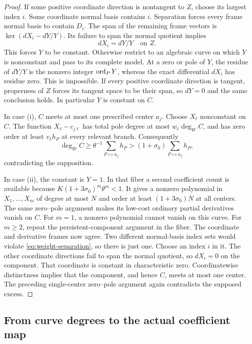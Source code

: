 \begin{proof}
If some positive coordinate direction is nontangent to \(Z\),
choose its largest index \(i\). Some coordinate normal basis contains
\(i\). Separation forces every frame normal basis to contain \(D_i\).
The span of the remaining frame vectors is
\(\ker(dX_i-dY/Y)\). Its failure to span the normal quotient implies
\[
 dX_i=dY/Y\quad\text{on }Z.
\]
This forces \(Y\) to be constant. Otherwise restrict to an algebraic
curve on which \(Y\) is nonconstant and pass to its complete model.
At a zero or pole of \(Y\), the residue of \(dY/Y\) is the
nonzero integer \(\operatorname{ord}_PY\), whereas the exact differential \(dX_i\)
has residue zero. This is impossible.
If every positive coordinate direction is tangent, properness of \(Z\)
forces its tangent space to be their span, so \(dY=0\) and the same
conclusion holds. In particular \(Y\) is constant on \(C\).

In case (i), \(C\) meets at most one prescribed center \(a_j\).
Choose \(X_\ell\) nonconstant on \(C\). The function
\(X_\ell-c_{j\ell}\) has total pole degree at most
\(w_\ell\deg_W C\), and has zero order at least \(v_\ell h_P\)
at every relevant branch. Consequently
\[
 \deg_W C\ge\theta^{-1}\sum_{P\mapsto a_j}h_P
          >(1+\sigma_0)\sum_{P\mapsto a_j}h_P,
\]
contradicting the supposition.

In case (ii), the constant is \(Y=1\).
In that fiber a second coefficient count is available because
\(K(1+3\sigma_0)^m\theta^m<1\).
It gives a nonzero polynomial in \(X_1,\ldots,X_m\) of degree
at most \(N\) and order at least \((1+3\sigma_0)N\) at all centers.
The same zero--pole argument makes its low-cost ordinary partial
derivatives vanish on \(C\).
For \(m=1\), a nonzero polynomial cannot vanish on this curve.
For \(m\ge2\), repeat the persistent-component argument in the fiber.
The coordinate and derivative frames now agree.
Two different normal-basis index sets would violate
\eqref{eq:weight-separation}, so there is just one.
Choose an index \(i\) in it. The other coordinate directions fail
to span the normal quotient, so \(dX_i=0\) on the component.
That coordinate is constant in characteristic zero.
Coordinatewise distinctness implies that the component, and hence
\(C\), meets at most one center. The preceding single-center
zero--pole argument again contradicts the supposed excess.
\end{proof}

\subsection{From curve degrees to the actual coefficient map}

